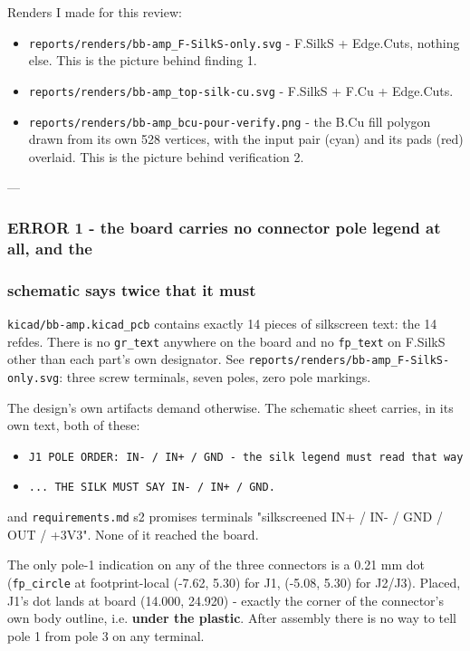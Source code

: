 \documentclass[11pt,a4paper]{article}
\begin{document}
Renders I made for this review:

\begin{itemize}
\item \texttt{reports/renders/bb-amp\_F-SilkS-only.svg} - F.SilkS + Edge.Cuts, nothing else.
This is the picture behind finding 1.
\item \texttt{reports/renders/bb-amp\_top-silk-cu.svg} - F.SilkS + F.Cu + Edge.Cuts.
\item \texttt{reports/renders/bb-amp\_bcu-pour-verify.png} - the B.Cu fill polygon drawn
from its own 528 vertices, with the input pair (cyan) and its pads (red)
overlaid. This is the picture behind verification 2.
\end{itemize}
---

\subsubsection*{ERROR 1 - the board carries no connector pole legend at all, and the}
\subsubsection*{schematic says twice that it must}
\texttt{kicad/bb-amp.kicad\_pcb} contains exactly 14 pieces of silkscreen text: the 14 refdes. There is no \texttt{gr\_text} anywhere on the board and no \texttt{fp\_text} on F.SilkS other than each part's own designator. See \texttt{reports/renders/bb-amp\_F-SilkS-only.svg}: three screw terminals, seven poles, zero pole markings.

The design's own artifacts demand otherwise. The schematic sheet carries, in its own text, both of these:

\begin{itemize}
\item \texttt{J1 POLE ORDER: IN- / IN+ / GND - the silk legend must read that way}
\item \texttt{... THE SILK MUST SAY IN- / IN+ / GND.}
\end{itemize}
and \texttt{requirements.md} s2 promises terminals "silkscreened IN+ / IN- / GND / OUT / +3V3". None of it reached the board.

The only pole-1 indication on any of the three connectors is a 0.21 mm dot (\texttt{fp\_circle} at footprint-local (-7.62, 5.30) for J1, (-5.08, 5.30) for J2/J3). Placed, J1's dot lands at board (14.000, 24.920) - exactly the corner of the connector's own body outline, i.e. \textbf{under the plastic}. After assembly there is no way to tell pole 1 from pole 3 on any terminal.
\end{document}
